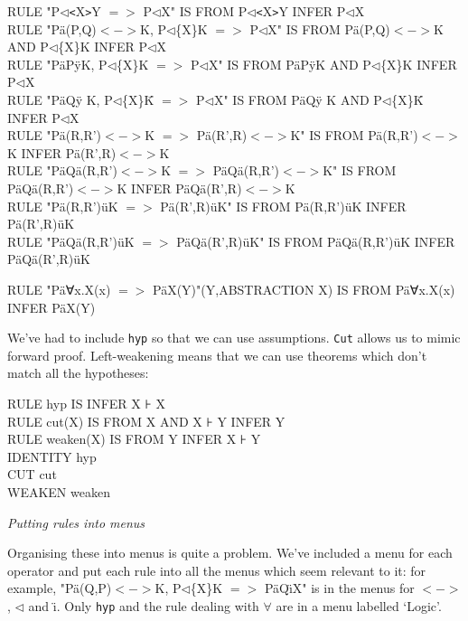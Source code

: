 RULE "P$\triangleleft$\texttt{<}X\texttt{>}Y $=>$ P$\triangleleft$X" IS FROM P$\triangleleft$\texttt{<}X\texttt{>}Y INFER P$\triangleleft$X\\
RULE "P\"{a}(P,Q)$<->$K, P$\triangleleft$\{X\}K $=>$ P$\triangleleft$X" IS FROM P\"{a}(P,Q)$<->$K AND P$\triangleleft$\{X\}K INFER P$\triangleleft$X\\
RULE "P\"{a}P\"{y}K, P$\triangleleft$\{X\}K $=>$ P$\triangleleft$X" IS FROM P\"{a}P\"{y}K AND P$\triangleleft$\{X\}K INFER P$\triangleleft$X\\
RULE "P\"{a}Q\"{y} K, P$\triangleleft$\{X\}K\={} $=>$ P$\triangleleft$X" IS FROM P\"{a}Q\"{y} K AND P$\triangleleft$\{X\}K\={} INFER P$\triangleleft$X\\
RULE "P\"{a}(R,R')$<->$K $=>$ P\"{a}(R',R)$<->$K" IS FROM P\"{a}(R,R')$<->$K INFER P\"{a}(R',R)$<->$K\\
RULE "P\"{a}Q\"{a}(R,R')$<->$K $=>$ P\"{a}Q\"{a}(R,R')$<->$K" IS FROM P\"{a}Q\"{a}(R,R')$<->$K INFER P\"{a}Q\"{a}(R',R)$<->$K\\
RULE "P\"{a}(R,R')\"{u}K $=>$ P\"{a}(R',R)\"{u}K" IS FROM P\"{a}(R,R')\"{u}K INFER P\"{a}(R',R)\"{u}K\\
RULE "P\"{a}Q\"{a}(R,R')\"{u}K $=>$ P\"{a}Q\"{a}(R',R)\"{u}K" IS FROM P\"{a}Q\"{a}(R,R')\"{u}K INFER P\"{a}Q\"{a}(R',R)\"{u}K

RULE "P\"{a}∀x.X(x) $=>$ P\"{a}X(Y)"(Y,ABSTRACTION X) IS FROM P\"{a}∀x.X(x) INFER P\"{a}X(Y)


We've had to include \texttt{hyp} so that we can use assumptions. \texttt{Cut} allows us to mimic forward proof. Left-weakening means that we can use theorems which don't match all the hypotheses:

RULE hyp IS INFER X ⊦ X\\
RULE cut(X) IS FROM X AND X ⊦ Y INFER Y\\
RULE weaken(X) IS FROM Y INFER X ⊦ Y\\
IDENTITY hyp\\
CUT cut\\
WEAKEN weaken


\textit{Putting rules into menus}


Organising these into menus is quite a problem. We've included a menu for each operator and put each rule into all the menus which seem relevant to it: for example, "P\"{a}(Q,P)$<->$K, P$\triangleleft$\{X\}K $=>$ P\"{a}Q\"{\i}X" is in the menus for $<->$, $\triangleleft$ and \"{\i}. Only \texttt{hyp} and the rule dealing with \ensuremath{\forall} are in a menu labelled `Logic'.


